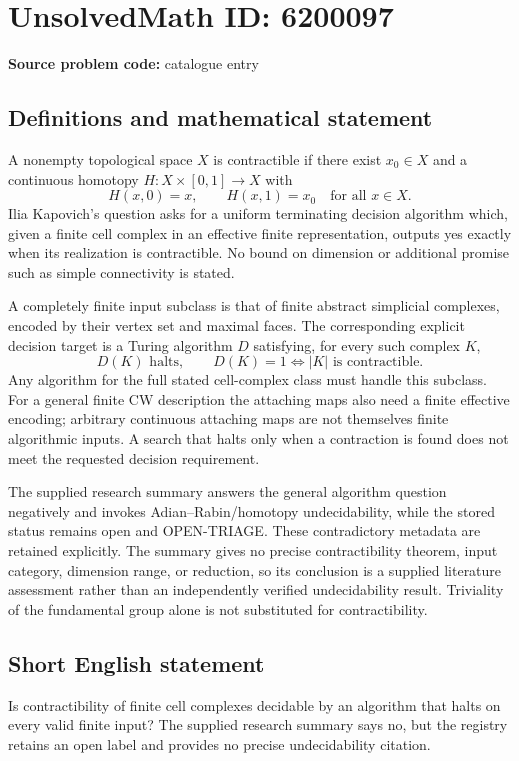 \documentclass[11pt]{article}
\begin{document}
\section*{UnsolvedMath ID: 6200097}
\textbf{Source problem code:} catalogue entry
\subsection{Definitions and mathematical statement}
A nonempty topological space \(X\) is contractible if there exist \(x_0\in X\) and a continuous homotopy \(H:X\times[0,1]\to X\) with
\[
H(x,0)=x,\qquad H(x,1)=x_0\quad\text{for all }x\in X.
\]
Ilia Kapovich's question asks for a uniform terminating decision algorithm which, given a finite cell complex in an effective finite representation, outputs yes exactly when its realization is contractible. No bound on dimension or additional promise such as simple connectivity is stated.

A completely finite input subclass is that of finite abstract simplicial complexes, encoded by their vertex set and maximal faces. The corresponding explicit decision target is a Turing algorithm \(D\) satisfying, for every such complex \(K\),
\[
D(K)\text{ halts},\qquad D(K)=1\iff |K|\text{ is contractible}.
\]
Any algorithm for the full stated cell-complex class must handle this subclass. For a general finite CW description the attaching maps also need a finite effective encoding; arbitrary continuous attaching maps are not themselves finite algorithmic inputs. A search that halts only when a contraction is found does not meet the requested decision requirement.

The supplied research summary answers the general algorithm question negatively and invokes Adian--Rabin/homotopy undecidability, while the stored status remains open and OPEN-TRIAGE. These contradictory metadata are retained explicitly. The summary gives no precise contractibility theorem, input category, dimension range, or reduction, so its conclusion is a supplied literature assessment rather than an independently verified undecidability result. Triviality of the fundamental group alone is not substituted for contractibility.
\subsection{Short English statement}
Is contractibility of finite cell complexes decidable by an algorithm that halts on every valid finite input? The supplied research summary says no, but the registry retains an open label and provides no precise undecidability citation.
\end{document}
